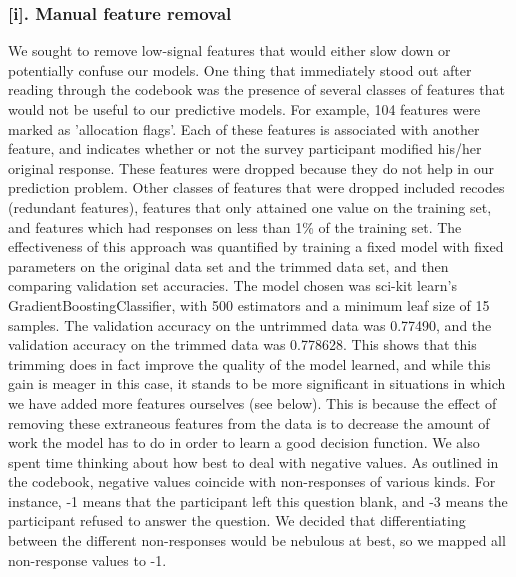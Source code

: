 \subsubsection*{[i]. Manual feature removal}
We sought to remove low-signal features that would either slow down or potentially confuse our models. One thing that immediately stood out after reading through the codebook was the presence of several classes of features that would not be useful to our predictive models. For example,  104 features were marked as 'allocation flags'. Each of these features is associated with another feature, and indicates whether or not the survey participant modified his/her original response. These features were dropped because they do not help in our prediction problem. Other classes of features that were dropped included recodes (redundant features), features that only attained one value on the training set, and features which had responses on less than 1\% of the training set. The effectiveness of this approach was quantified by training a fixed model with fixed parameters on the original data set and the trimmed data set, and then comparing validation set accuracies. The model chosen was sci-kit learn's GradientBoostingClassifier, with 500 estimators and a minimum leaf size of 15 samples. The validation accuracy on the untrimmed data was 0.77490, and the validation accuracy on the trimmed data was 0.778628. This shows that this trimming does in fact improve the quality of the model learned, and while this gain is meager in this case, it stands to be more significant in situations in which we have added more features ourselves (see below). This is because the effect of removing these extraneous features from the data is to decrease the amount of work the model has to do in order to learn a good decision function. We also spent time thinking about how best to deal with negative values. As outlined in the codebook, negative values coincide with non-responses of various kinds. For instance, -1 means that the participant left this question blank, and -3 means the participant refused to answer the question. We decided that differentiating between the different non-responses would be nebulous at best, so we mapped all non-response values to -1.\\

